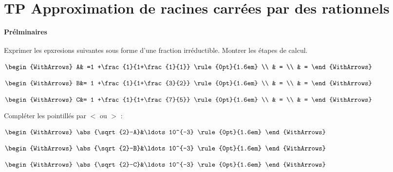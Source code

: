%	 
%	 

\newpage
\section{TP Approximation de racines carrées par des rationnels}


\paragraph{Prélminaires} Exprimer les epxresions suivantes sous forme d'une fraction irréductible. Montrer les étapes de calcul.


\noindent\hfill\parbox{0.31\linewidth}{	
	$\begin{WithArrows}
		A& =1 +\frac{1}{1+\frac{1}{1}} \rule{0pt}{1.6em} \\
		 & =   \\ 
		 & =   
	\end{WithArrows}$ 	
} \hfill\parbox{0.31\linewidth}{	
	$\begin{WithArrows}
		B&= 1 +\frac{1}{1+\frac{3}{2}} \rule{0pt}{1.6em} \\
		& =   \\  
		& =    
	\end{WithArrows}$  	
}  \hfill\parbox{0.31\linewidth}{	
	$\begin{WithArrows}
		C&=  1 +\frac{1}{1+\frac{7}{5}} \rule{0pt}{1.6em} \\
		& =   \\ 
		& =     
	\end{WithArrows}$
}   

Compléter les pointillés par $<$ ou $>$ :

\noindent\hfill\parbox{0.31\linewidth}{	
	$\begin{WithArrows} 
		\abs{\sqrt{2}-A}&\ldots 10^{-3} \rule{0pt}{1.6em}   
	\end{WithArrows}$ 	
} \hfill\parbox{0.31\linewidth}{	
	$\begin{WithArrows} 
		\abs{\sqrt{2}-B}&\ldots 10^{-3} \rule{0pt}{1.6em}   
	\end{WithArrows}$  	
}  \hfill\parbox{0.31\linewidth}{	
	$\begin{WithArrows} 
		\abs{\sqrt{2}-C}&\ldots 10^{-3} \rule{0pt}{1.6em}   
	\end{WithArrows}$
} 

